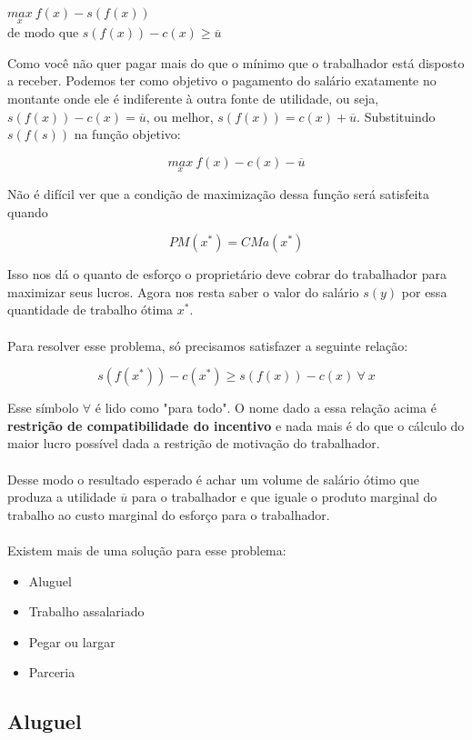 \documentclass[a4paper,11pt,oneside]{book}
\theoremstyle{definition}
\theoremstyle{break}
\begin{document}
\begin{center}
	$\underset{x}{max} \ f(x) - s(f(x))$ \\
	$\textrm{de modo que } s(f(x)) - c(x) \geq \overline{u}$
\end{center}

Como você não quer pagar mais do que o mínimo que o trabalhador está disposto a receber. Podemos ter como objetivo o pagamento do salário exatamente no montante onde ele é indiferente à outra fonte de utilidade, ou seja, $s(f(x)) - c(x) = \overline{u}$, ou melhor, $s(f(x)) = c(x) + \overline{u}$. Substituindo $s(f(s))$ na função objetivo:

$$ \underset{x}{max} \ f(x) - c(x) - \overline{u} $$

Não é difícil ver que a condição de maximização dessa função será satisfeita quando

$$ PM(x^*) = CMa(x^*) $$

Isso nos dá o quanto de esforço o proprietário deve cobrar do trabalhador para maximizar seus lucros. Agora nos resta saber o valor do salário $s(y)$ por essa quantidade de trabalho ótima $x^*$.
\\~\\
Para resolver esse problema, só precisamos satisfazer a seguinte relação:

$$ s(f(x^*)) - c(x^*) \geq s(f(x)) - c(x) \ \forall \ x $$

Esse símbolo $\forall$ é lido como "para todo". O nome dado a essa relação acima é \textbf{restrição de compatibilidade do incentivo} e nada mais é do que o cálculo do maior lucro possível dada a restrição de motivação do trabalhador. 
\\~\\
Desse modo o resultado esperado é achar um volume de salário ótimo que produza a utilidade $\overline{u}$ para o trabalhador e que iguale o produto marginal do trabalho ao custo marginal do esforço para o trabalhador.
\\~\\
Existem mais de uma solução para esse problema:
\begin{itemize}
	\item Aluguel
	\item Trabalho assalariado
	\item Pegar ou largar
	\item Parceria
\end{itemize}

\subsection*{Aluguel}
\end{document}
